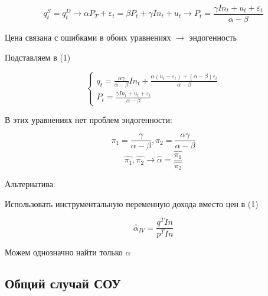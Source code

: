 \documentclass[a4paper, 12pt]{article}
\begin{document}
\[q_{t}^{S} = q_{t}^{D} \rightarrow \alpha P_{T} + \varepsilon_{t} = \beta P_{t} + \gamma In_{t} + u_{t} \rightarrow P_{t} = \frac{\gamma In_{t} + u_{t} + \varepsilon_{t}}{\alpha - \beta}\]

Цена связана с ошибками в обоих уравнениях $\rightarrow$ эндогенность

Подставляем в (1)

\[\begin{cases}
    q_{t} = \frac{\alpha \gamma}{\alpha - \beta}In_{t} + \frac{\alpha (u_{t} - \varepsilon_{t}) + (\alpha - \beta) \varepsilon_{t}}{\alpha - \beta} \\
    P_{t} = \frac{\gamma In_{t} + u_{t} + \varepsilon_{t}}{\alpha - \beta}
\end{cases}\]

В этих уравнениях нет проблем эндогенности:

\[\pi_{1} = \frac{\gamma}{\alpha - \beta}, \pi_{2} = \frac{\alpha \gamma}{\alpha - \beta}\]
\[\hat{\pi_{1}}, \hat{\pi_{2}} \rightarrow \hat{\alpha} = \frac{\hat{\pi_{1}}}{\hat{\pi_{2}}}\]

Альтернатива:

Использовать инструментальную переменную дохода вместо цен в (1)

\[\hat{\alpha}_{IV} = \frac{q^{T}In}{p^{T}In}\]

Можем однозначно найти только $\alpha$

\subsection{Общий случай СОУ}
\end{document}
